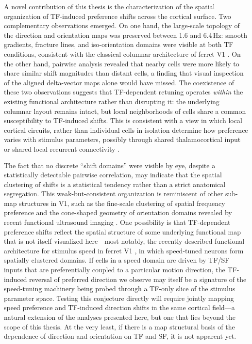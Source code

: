 \documentclass{brandeis-thesis3.3}
\begin{document}
A novel contribution of this thesis is the characterization of
the spatial organization of TF-induced preference shifts across
the cortical surface. Two complementary observations emerged.
On one hand, the large-scale topology of the direction and
orientation maps was preserved between 1.6 and 6.4\,Hz: smooth
gradients, fracture lines, and iso-orientation domains were
visible at both TF conditions, consistent with the classical
columnar architecture of ferret V1
\citep{Bonhoeffer1991, Weliky1996}. On the other hand,
pairwise analysis revealed that nearby cells were more likely
to share similar shift magnitudes than distant cells, a finding
that visual inspection of the aligned delta-vector maps alone
would have missed. The coexistence of these two observations
suggests that TF-dependent retuning operates \textit{within}
the existing functional architecture rather than disrupting it:
the underlying columnar layout remains intact, but local
neighborhoods of cells share a common susceptibility to
TF-induced shifts. This is consistent with a view in which
local cortical circuits, rather than individual cells in
isolation determine how preference varies with stimulus
parameters, possibly through shared thalamocortical input or
shared local recurrent connectivity \citep{Nauhaus2008}.

The fact that no discrete ``shift domains'' were visible by
eye, despite a statistically detectable pairwise correlation,
may indicate that the spatial clustering of shifts is a
statistical tendency rather than a strict anatomical
segregation. This weak-but-consistent organization is
reminiscent of other sub-map structures in V1, such as the
fine-scale clustering of spatial frequency preference and the
cone-shaped geometry of orientation domains revealed by recent
functional ultrasound imaging \citep{Hu2023}. One possibility
is that TF-dependent preference shifts reflect the spatial
structure of some underlying functional map that is not itself
visualized here---most notably, the recently described
functional architecture for stimulus speed in ferret V1
\citep{Casanova2025}, in which speed-tuned neurons form
spatially clustered domains. If cells in a speed domain are
driven by TF/SF inputs that are preferentially coupled to a
particular motion direction, the TF-induced reversal of
preferred direction we observe may itself be a signature of the
speed-tuning machinery being probed through a TF-only slice of
the stimulus parameter space. Testing this conjecture directly
will require jointly mapping speed preference and TF-induced
direction shifts in the same cortical field---a natural
extension of the analyses presented here, but one that lies
beyond the scope of this thesis. At the very least, if there is a map structural basis of the dependence of direction and orientation on TF and SF, it is not apparent yet.
\end{document}

